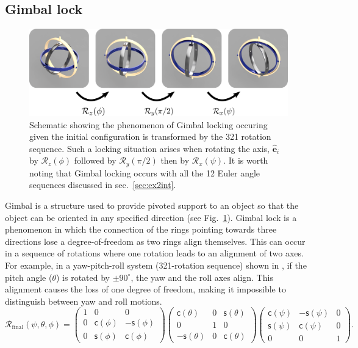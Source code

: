 \documentclass{article}
\def\eh{\hat{\mathbf{e}}}
\def\R{\mathcal{R}}
\def\c{\textsf{c}}
\def\s{\textsf{s}}
\begin{document}
\subsection{Gimbal lock}
\begin{figure}[t!]
  \centering
  \includegraphics[width=\textwidth]{figs/figGimbal.png}
  \caption{Schematic showing the phenomenon of Gimbal locking occuring given the initial configuration is transformed by the 321 rotation sequence. Such a locking situation arises when rotating the axis, $\eh_i$ by $\R_z(\phi)$ followed by $\R_y(\pi/2)$ then by $\R_x(\psi)$. It is worth noting that Gimbal locking occurs with all the 12 Euler angle sequences discussed in sec.~\ref{sec:ex2int}.}
  \label{fig:gimbLck}
\end{figure}
Gimbal is a structure used to provide pivoted support to an object so that the object can be oriented in any specified direction (see Fig.~\ref{fig:gimbLck}). Gimbal lock is a phenomenon in which the connection of the rings pointing towards three directions lose a degree-of-freedom as two rings align themselves. This can occur in a sequence of rotations where one rotation leads to an alignment of two axes. For example, in a yaw-pitch-roll system (321-rotation sequence) shown in , if the pitch angle (\( \theta \)) is rotated by \( \pm 90^\circ \), the yaw and the roll axes align. This alignment causes the loss of one degree of freedom, making it impossible to distinguish between yaw and roll motions.
\[
\R_{\text{final}} (\psi, \theta, \phi) = 
\begin{pmatrix}
1 & 0 & 0 \\
0 & \c(\phi) & -\s(\phi) \\
0 & \s(\phi) & \c(\phi)
\end{pmatrix}
\begin{pmatrix}
\c(\theta) & 0 & \s(\theta) \\
0 & 1 & 0 \\
-\s(\theta) & 0 & \c(\theta)
\end{pmatrix}
\begin{pmatrix}
\c(\psi) & -\s(\psi) & 0 \\
\s(\psi) & \c(\psi) & 0 \\
0 & 0 & 1
\end{pmatrix}.
\]
\end{document}
